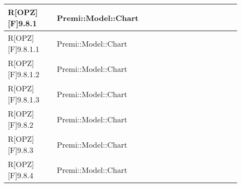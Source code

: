 \begin{table}[h]
\begin{center}
\begin{tabular}{|p{0.2\linewidth}|p{0.75\linewidth}|}
		\midrule
			R[OPZ][F]9.8.1 & Premi::Model::Chart\\
		\midrule
			R[OPZ][F]9.8.1.1 & Premi::Model::Chart\\
		\midrule
			R[OPZ][F]9.8.1.2 & Premi::Model::Chart\\
		\midrule
			R[OPZ][F]9.8.1.3 & Premi::Model::Chart\\
		\midrule
			R[OPZ][F]9.8.2 & Premi::Model::Chart\\
		\midrule
			R[OPZ][F]9.8.3 & Premi::Model::Chart\\
		\midrule
			R[OPZ][F]9.8.4 & Premi::Model::Chart\\
		\bottomrule
		\end{tabular}
	\end{center}
\end{table}

